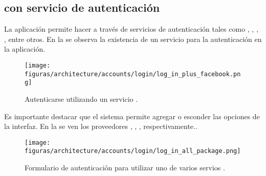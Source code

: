\subsection{\loginUpperCPT  con servicio de autenticación \thirdParty}

La aplicación permite hacer \loginCPT a través de servicios de autenticación \thirdParty tales como \facebook, \googleNAME, \twitterNAME, \gitHubNAME, entre otros. En la  se observa la existencia de un servicio \thirdParty para la autenticación en la aplicación.


\begin{figure}[H]
	\centering
	\texttt{[image: figuras/architecture/accounts/login/log\_in\_plus\_facebook.png]}

	\caption{Autenticarse utilizando un servicio \thirdParty.}
	\label{figure:architecture:accounts:login:log_in_plus_facebook}
\end{figure}

Es importante destacar que el sistema permite agregar o esconder las opciones \thirdParty de la interfaz. En la  se ven los proveedores \oauthLoginINT \facebook, \gitHubNAME, \googleNAME, \twitterNAME respectivamente..

\begin{figure}[H]
	\centering
	\texttt{[image: figuras/architecture/accounts/login/log\_in\_all\_package.png]}

	\caption{Formulario de autenticación para utilizar uno de varios servios \thirdParty.}
	\label{figure:architecture:accounts:login:log_in_all_package}
\end{figure}